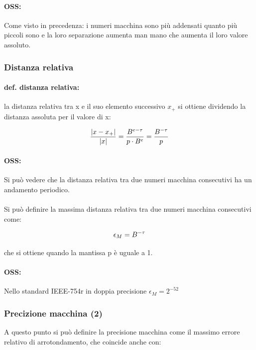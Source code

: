 \documentclass[a4paper, 11pt]{article}
\begin{document}
        \paragraph{OSS: } Come visto in precedenza: i numeri macchina sono più addensati quanto più
        piccoli sono e la loro separazione aumenta man mano che aumenta il loro valore assoluto.
        


        \subsubsection{Distanza relativa}
        \paragraph{def. distanza relativa: } la distanza relativa tra x e il suo elemento successivo $x_+$ si ottiene dividendo  la distanza assoluta per il valore di x:

        \begin{align}
            \frac{|x-x_+|}{|x|} = \frac{B^{e-\tau}}{p\cdot B^e} = \frac{B^{-\tau}}{p} \notag
        \end{align}

        \paragraph{OSS: } Si può vedere che la distanza relativa tra due numeri macchina consecutivi ha
        un andamento periodico.

        \paragraph{} 
        Si può definire la massima distanza relativa tra due numeri macchina consecutivi come:

        \begin{align}
            \epsilon_M = B^{-\tau} \notag
        \end{align}

        che si ottiene quando la mantissa p è uguale a 1.
        \paragraph{OSS: } Nello standard IEEE-754r in doppia precisione $\epsilon_M = 2^{-52}$



        \subsubsection*{Precizione macchina (2)}
        A questo punto si può definire la precisione macchina come il massimo errore relativo di arrotondamento, che coincide anche con:
\end{document}
